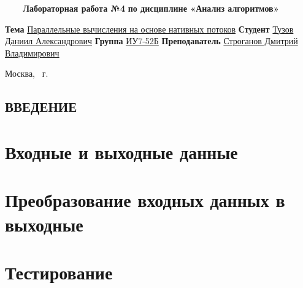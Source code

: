 \documentclass{article}
\begin{document}
\begin{titlepage}
	\noindent\begin{minipage}{1.0\textwidth}\centering
		\Large\textbf{   ~~~ Лабораторная работа №4}\newline
		\textbf{по дисциплине «Анализ алгоритмов»}\newline\newline\newline\newline\newline
	\end{minipage}

	\noindent\textbf{Тема} \underline{Параллельные вычисления на основе нативных потоков}\newline\newline
	\textbf{Студент} \underline{Тузов Даниил Александрович}\newline\newline
	\textbf{Группа} \underline{ИУ7-52Б}\newline\newline
	\textbf{Преподаватель} \underline{Строганов Дмитрий Владимирович}
	
	\begin{center}
		\vfill
		Москва, \the\year ~г.
	\end{center}
	\restoregeometry
	\clearpage
\end{titlepage}

\renewcommand{\contentsname}{\begin{center}СОДЕРЖАНИЕ\end{center}} 
\tableofcontents
\setcounter{page}{2}
\clearpage

\begin{center}\section*{ВВЕДЕНИЕ}\end{center}


\clearpage\section{Входные и выходные данные}


\clearpage\section{Преобразование входных данных в выходные}


\clearpage\section{Тестирование}
\end{document}
